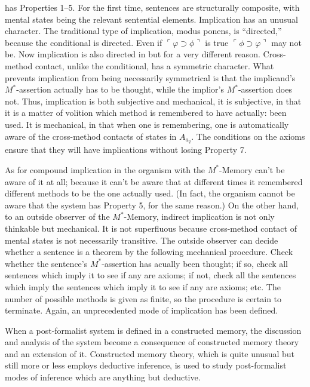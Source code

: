  has Properties 1--5. For the first time, sentences are 
structurally composite, with mental states being the relevant sentential 
elements. Implication has an unusual character. The traditional type of 
implication, modus ponens, is \enquote{directed,} because the conditional is 
directed. Even if $\ulcorner\varphi\supset\phi\urcorner$ is true 
$\ulcorner\phi\supset\varphi\urcorner$ may not be. Now implication is also 
directed in  but for a very different reason. 
Cross-method contact, unlike the conditional, has a symmetric character. 
What prevents implication from being necessarily symmetrical is that the 
implicand's $M^*$-assertion actually has to be thought, while the implior's 
$M^*$-assertion does not. Thus, implication is both subjective and mechanical, 
it is subjective, in that it is a matter of volition which method is remembered 
to have actually: been used. It is mechanical, in that when one is 
remembering, one is automatically aware of the cross-method contacts of 
states in $A_{a_q}$. The conditions on the axioms ensure that they will have 
implications without losing Property 7. 

As for compound implication in  the organism 
with the $M^*$-Memory can't be aware of it at all; because it can't be aware 
that at different times it remembered different methods to be the one 
actually used. (In fact, the organism cannot be aware that the system has 
Property 5, for the same reason.) On the other hand, to an outside observer 
of the $M^*$-Memory, indirect implication is not only thinkable but 
mechanical. It is not superfluous because cross-method contact of mental 
states is not necessarily transitive. The outside observer can decide whether a 
sentence is a theorem by the following mechanical procedure. Check 
whether the sentence's $M^*$-assertion has acually been thought; if so, check all 
sentences which imply it to see if any are axioms; if not, check all the 
sentences which imply the sentences which imply it to see if any are axioms; 
etc. The number of possible methods is given as finite, so the procedure is 
certain to terminate. Again, an unprecedented mode of implication has been 
defined. 

When a post-formalist system is defined in a constructed memory, the 
discussion and analysis of the system become a consequence of constructed 
memory theory and an extension of it. Constructed memory theory, which 
is quite unusual but still more or less employs deductive inference, is used to 
study post-formalist modes of inference which are anything but deductive. 

